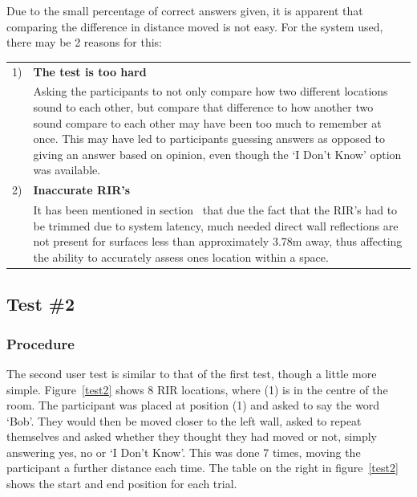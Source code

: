 \documentclass[../../main.tex]{subfiles}
\begin{document}

			Due to the small percentage of correct answers given, it is apparent that comparing the difference in distance moved is not easy. For the system used, there may be 2 reasons for this:

			\begin{tabular}{l p{} }
			1) & \textbf{The test is too hard} \\
			& Asking the participants to not only compare how two different locations sound to each other, but compare that difference to how another two sound compare to each other may have been too much to remember at once. This may have led to participants guessing answers as opposed to giving an answer based on opinion, even though the `I Don't Know' option was available. \\
			2) & \textbf{Inaccurate \ac{RIR}'s} \\
			& It has been mentioned in section~\fullref{RIRtrimming} that due the fact that the \ac{RIR}'s had to be trimmed due to system latency, much needed direct wall reflections are not present for surfaces less than approximately 3.78m away, thus affecting the ability to accurately assess ones location within a space.
			\end{tabular}

		\subsection{Test \#2}

			\subsubsection{Procedure}
				The second user test is similar to that of the first test, though a little more simple. Figure~\ref{test2} shows 8 \ac{RIR} locations, where (1) is in the centre of the room. The participant was placed at position (1) and asked to say the word `Bob'. They would then be moved closer to the left wall, asked to repeat themselves and asked whether they thought they had moved or not, simply answering yes, no or `I Don't Know'. This was done 7 times, moving the participant a further distance each time. The table on the right in figure~\ref{test2} shows the start and end position for each trial.
\end{document}
